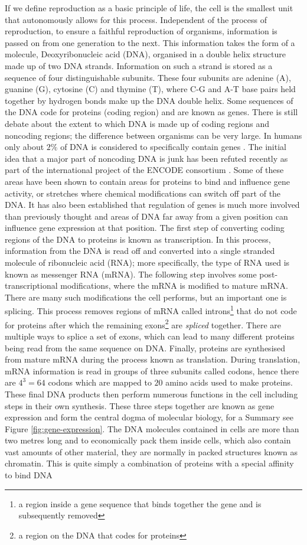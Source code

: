 If we define reproduction as a basic principle of life, the cell is the smallest unit that autonomously allows for this process. Independent of the process of reproduction, to ensure a faithful reproduction of organisms, information is passed on from one generation to the next. This information takes the form of a molecule, Deoxyribonucleic acid (DNA), organised in a double helix structure made up of two DNA strands. Information on such a strand is stored as a sequence of four distinguishable subunits. These four subunits are adenine (A), guanine (G), cytosine (C) and thymine (T), where C-G and A-T base pairs held together by hydrogen bonds make up the DNA double helix. Some sequences of the DNA code for proteins (coding region) and are known as genes.  There is still debate about the extent to which DNA is made up of coding regions and noncoding regions; the difference between organisms can be very large. In humans only about $2\%$ of DNA is considered to specifically contain genes \citep{Elgar:2008dm}. The initial idea that a major part of noncoding DNA is junk has been refuted recently as part of the international project of the ENCODE consortium \citep{Pennisi:2012wl}. Some of these areas have been shown to contain areas for proteins to bind and influence gene activity, or stretches where chemical modifications can  switch off part of the DNA. It has also been established that regulation of genes is much more involved than previously thought and areas of DNA far away from a given position can influence gene expression at that position. The first step of converting coding regions of the DNA to proteins is known as transcription. In this process, information from the DNA is read off and converted into a single stranded molecule of ribonucleic acid (RNA); more specifically, the type of RNA used is known as messenger RNA (mRNA). The following step involves some post-transcriptional modifications, where the mRNA is modified to mature mRNA. There are many such modifications the cell performs, but an important one is splicing. This process removes regions of mRNA called introns\footnote{a region inside a gene sequence that binds together the gene and is subsequently removed} that do not code for proteins after which the remaining exons\footnote{a region on the DNA that codes for proteins} are \emph{spliced} together. There are multiple ways to splice a set of exons, which can lead to many different proteins being read from the same sequence on DNA. Finally, proteins are synthesised from mature mRNA during the process known as translation. During translation, mRNA information is read in groups of three subunits called codons, hence there are $4^3 = 64$ codons which are mapped to $20$ amino acids used to make proteins. These final DNA products then perform numerous functions in the cell including steps in their own synthesis. These three steps together are known as gene expression and form the central dogma of molecular biology, for a Summary see Figure \ref{fig:gene-expression}. The DNA molecules contained in cells are more than two metres long and to economically pack them inside cells, which also contain vast amounts of other material, they are normally in packed structures known as chromatin. This is quite simply a combination of proteins with a special affinity to bind DNA 